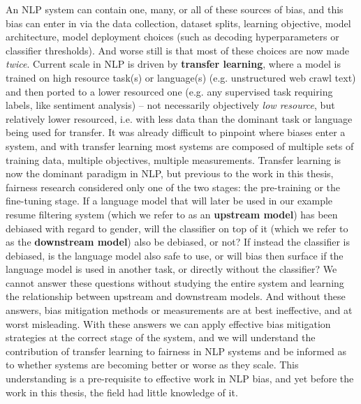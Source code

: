 An NLP system can contain one, many, or all of these sources of bias, and this bias can enter in via the data collection, dataset splits, learning objective, model architecture, model deployment choices (such as decoding hyperparameters or classifier thresholds). And worse still is that most of these choices are now made \textit{twice}.  Current scale in NLP is driven by \textbf{transfer learning}, where a model is trained on high resource task(s) or language(s) (e.g. unstructured web crawl text) and then ported to a lower resourced one (e.g. any supervised task requiring labels, like sentiment analysis) -- not necessarily objectively \textit{low resource}, but relatively lower resourced, i.e. with less data than the dominant task or language being used for transfer. 
It was already difficult to pinpoint where biases enter a system, and with transfer learning most systems are composed of multiple sets of training data, multiple objectives, multiple measurements. Transfer learning is now the dominant paradigm in NLP, but previous to the work in this thesis, fairness research considered only one of the two stages: the pre-training or the fine-tuning stage. If a language model that will later be used in our example resume filtering system (which we refer to as an \textbf{upstream model}) has been debiased with regard to gender, will the classifier on top of it (which we refer to as the \textbf{downstream model}) also be debiased, or not? If instead the classifier is debiased, is the language model also safe to use, or will bias then surface if the language model is used in another task, or directly without the classifier? We cannot answer these questions without studying the entire system and learning the relationship between upstream and downstream models. And without these answers,
bias mitigation methods or measurements are at best ineffective, and at worst misleading. With these answers we can apply effective bias mitigation strategies at the correct stage of the system, and we will understand the contribution of transfer learning to fairness in NLP systems and be informed as to whether systems are becoming better or worse as they scale. This understanding is a pre-requisite to effective work in NLP bias, and yet before the work in this thesis, the field had little knowledge of it.


